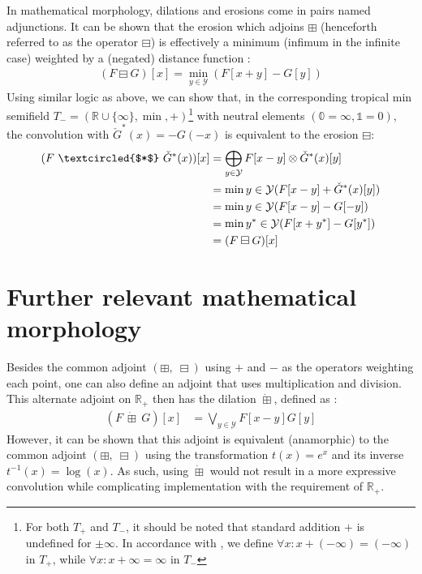 \documentclass[a4paper, 12pt]{report}
\begin{document}
In mathematical morphology, dilations and erosions come in pairs named adjunctions. It can be shown that the erosion which adjoins $\boxplus$ (henceforth referred to as the operator $\boxminus$) is effectively a minimum (infimum in the infinite case) weighted by a (negated) distance function \cite{heijmans1996morphological}: 
\begin{align}
	(F \boxminus G)[x]=\min_{y\in \mathcal{Y}}(F[x+y] - G[y])
\end{align}
\noindent
Using similar logic as above, we can show that, in the corresponding tropical min semifield $T_-=(\mathbb{R}\cup\{\infty\},\min,+)$\footnote{For both $T_+$ and $T_-$, it should be noted that standard addition $+$ is undefined for $\pm\infty$. In accordance with \cite{maragos}, we define $\forall x: x+(-\infty)=(-\infty)$ in $T_+$, while $\forall x: x+\infty=\infty$ in $T_-$} \cite{maragos} with neutral elements $(\mathbb{0}=\infty, \mathbb{1}=0)$, the convolution with $\check{G}^*(x)=-G(-x)$ is equivalent to the erosion $\boxminus$:
\begin{align}
	(F ~\textcircled{$*$}~ \check{G}^*(x))[x]
	&= \bigoplus_{y\in \mathcal{Y}}F[x-y] \otimes \check{G}^*(x)[y] \\
	&= \min{y\in \mathcal{Y}}(F[x-y] + \check{G}^*(x)[y]) \\
	&= \min{y\in \mathcal{Y}}(F[x-y] - G[-y]) \\
	&= \min{y^*\in \mathcal{Y}}(F[x+y^*] - G[y^*]) \\
	&= (F \boxminus G)[x]
\end{align}

\section{Further relevant mathematical morphology}
\label{sec:closing}
Besides the common adjoint $(\boxplus,\; \boxminus)$ using $+$ and $-$ as the operators weighting each point, one can also define an adjoint that uses multiplication and division. This alternate adjoint on $\mathbb{R}_+$ then has the dilation $\dot \boxplus$, defined as \cite{heijmans1996morphological}:
\begin{align}
	(F~ \dot\boxplus~ G)[x] &= \bigvee_{y\in \mathcal{Y}}F[x-y]G[y]
\end{align}
However, it can be shown that this adjoint is equivalent (anamorphic) to the common adjoint $(\boxplus,\; \boxminus)$ using the transformation $t(x)=e^x$ and its inverse $t^{-1}(x)=\log(x)$. As such, using $\dot \boxplus$ would not result in a more expressive convolution while complicating implementation with the requirement of $\mathbb{R}_+$.
\end{document}
